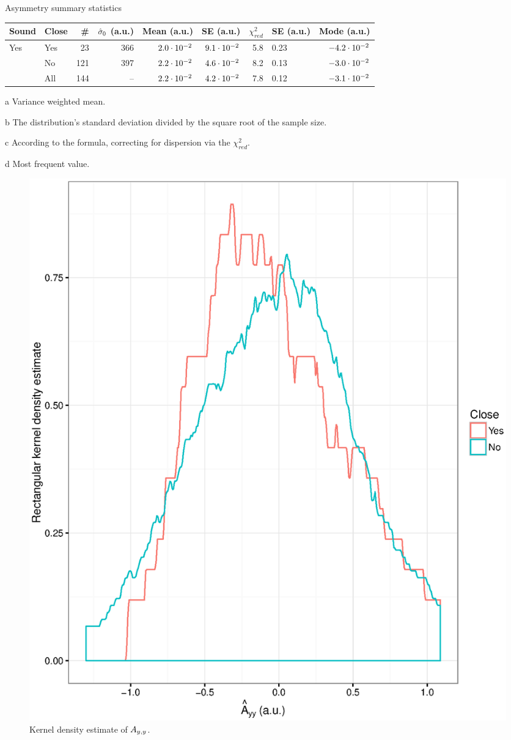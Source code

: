 \documentclass{report}
\begin{document}
\begin{threeparttable}[H]
	\centering
	\caption{Asymmetry summary statistics\label{tbl:AyySumStat}}
	\begin{tabular}{llrrrrrlr}
		\hline\hline
		Sound                & Close &  \# & $\CS*[0]$ (a.u.) & Mean\tnote{a} (a.u.) & SE\tnote{b} (a.u.) & $\chi^2_{red}$ & SE\tnote{c} (a.u.) & Mode\tnote{d} (a.u.) \\ \hline
		\multirow{3}{*}{Yes} & Yes   &  23 &              366 &       $2.0\cdot10^{-2}$ &     $9.1\cdot10^{-2}$ &            5.8 & 0.23               &      $-4.2\cdot10^{-2}$ \\
		                     & No    & 121 &              397 &       $2.2\cdot10^{-2}$ &     $4.6\cdot10^{-2}$ &            8.2 & 0.13               &      $-3.0\cdot10^{-2}$ \\
		                     & All   & 144 &               -- &       $2.2\cdot10^{-2}$ &     $4.2\cdot10^{-2}$ &            7.8 & 0.12               &      $-3.1\cdot10^{-2}$ \\ \hline
	\end{tabular}
	\begin{tablenotes}
		\item[a]{Variance weighted mean.}
		\item[b]{The distribution's standard deviation divided by the square root of the sample size.}
		\item[c]{According to the formula, correcting for dispersion via the $\chi^2_{red}$.}
		\item[d]{Most frequent value.}
	\end{tablenotes}
\end{threeparttable}

\begin{figure}
	\centering
	\includegraphics{Ayy_dens.eps}
	\caption{Kernel density estimate of $\Ayy$.\label{fig:Ayy_dens}}
\end{figure}
\end{document}
